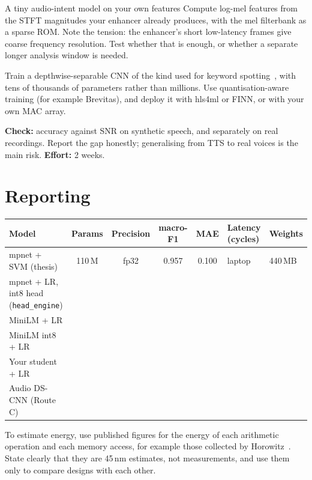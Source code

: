 \begin{stepbox}[label=st:ml:dscnn]{A tiny audio-intent model on your own features}
Compute log-mel features from the STFT magnitudes your enhancer already
produces, with the mel filterbank as a sparse ROM. Note the tension: the
enhancer's short low-latency frames give coarse frequency resolution. Test
whether that is enough, or whether a separate longer analysis window is needed.

Train a depthwise-separable CNN of the kind used for keyword
spotting~\cite{zhang2017helloedge}, with tens of thousands of parameters rather
than millions. Use quantisation-aware training (for example Brevitas), and
deploy it with hls4ml or FINN, or with your own MAC array.

\textbf{Check:} accuracy against SNR on synthetic speech, and separately on real
recordings. Report the gap honestly; generalising from TTS to real voices is the
main risk. \textbf{Effort:} 2 weeks.
\end{stepbox}

\section{Reporting}\label{sec:ml:report}

\begin{center}\scriptsize
\setlength{\tabcolsep}{3.5pt}
\begin{tabularx}{\textwidth}{@{}Lccccll@{}}
\toprule
Model & Params & Precision & macro-F1 & MAE & Latency (cycles) & Weights \\
\midrule
mpnet + SVM (thesis) & 110\,M & fp32 & 0.957 & 0.100 & laptop & 440\,MB \\
mpnet + LR, int8 head (\texttt{head\_engine}) & & & & & & \\
MiniLM + LR & & & & & & \\
MiniLM int8 + LR & & & & & & \\
Your student + LR & & & & & & \\
Audio DS-CNN (Route C) & & & & & & \\
\bottomrule
\end{tabularx}
\end{center}

To estimate energy, use published figures for the energy of each arithmetic
operation and each memory access, for example those collected by
Horowitz~\cite{ch12-13:horowitz2014energy}. State clearly that they are 45\,nm
estimates, not measurements, and use them only to compare designs with each
other.

